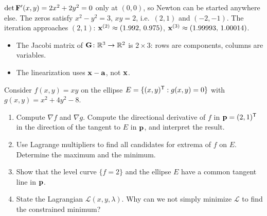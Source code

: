 \begin{solution}
 $\det\mathbf{F}'(x,y)=2x^2+2y^2=0$ only at $(0,0)$, so Newton can be started anywhere else. The zeros satisfy $x^2-y^2=3$, $xy=2$, i.e.\ $(2,1)$ and $(-2,-1)$. The iteration approaches $(2,1)$: $\mathbf{x}^{(2)}\approx(1.992,\,0.975)$, $\mathbf{x}^{(3)}\approx(1.99993,\,1.00014)$. 

\begin{trap}
\begin{itemize}
\item The Jacobi matrix of $\mathbf{G}\colon\mathbb{R}^3\to\mathbb{R}^2$ is $2\times3$: rows are components, columns are variables.
\item The linearization uses $\mathbf{x}-\mathbf{a}$, not $\mathbf{x}$.
\end{itemize}
\end{trap}
\end{solution}

Consider $f(x,y)=xy$ on the ellipse $E=\{(x,y)^{\mathsf{T}}:g(x,y)=0\}$ with $g(x,y)=x^2+4y^2-8$.
\begin{enumerate}
\item Compute $\nabla f$ and $\nabla g$. Compute the directional derivative of $f$ in $\mathbf{p}=(2,1)^{\mathsf{T}}$ in the direction of the tangent to $E$ in $\mathbf{p}$, and interpret the result.
\item Use Lagrange multipliers to find all candidates for extrema of $f$ on $E$. Determine the maximum and the minimum.
\item Show that the level curve $\{f=2\}$ and the ellipse $E$ have a common tangent line in $\mathbf{p}$.
\item State the Lagrangian $\mathcal L(x,y,\lambda)$. Why can we not simply minimize $\mathcal L$ to find the constrained minimum?
\end{enumerate}


